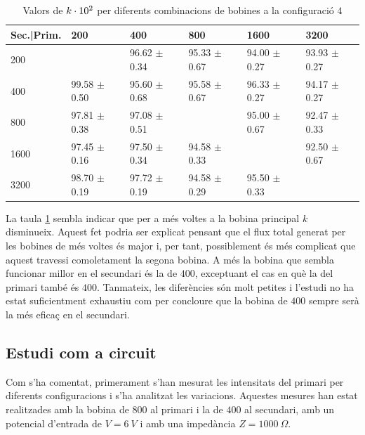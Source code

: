  \begin{table}[!htbp]\textwidth
     \centering
     \setlength\tabcolsep{2pt}
     \caption{Valors de $k \cdot \SI{d2}{}$ per diferents combinacions de bobines a la configuració $4$}
     \label{tab:k4}
\begin{tabular}{p{2cm}p{}p{}p{}p{}p{}}
			\toprule
		   {Sec.|Prim.}    &200&400&800&1600&3200 \\
			\midrule
			200 &  & 96.62 $\pm$ 0.34  & 95.33 $\pm$ 0.67 & 94.00 $\pm$ 0.27 &  93.93 $\pm$ 0.27 \\
			400 &  99.58 $\pm$ 0.50 & 95.60 $\pm$ 0.68 & 95.58 $\pm$ 0.67 & 96.33 $\pm$ 0.27 & 94.17 $\pm$ 0.27 \\
			800 &  97.81 $\pm$ 0.38 & 97.08 $\pm$ 0.51 & & 95.00 $\pm$ 0.67 & 92.47 $\pm$ 0.33\\
			1600 &  97.45 $\pm$ 0.16 & 97.50 $\pm$ 0.34 & 94.58 $\pm$ 0.33 & & 92.50 $\pm$ 0.67\\
			3200 & 98.70 $\pm$ 0.19 & 97.72 $\pm$ 0.19 & 94.58 $\pm$ 0.29 & 95.50 $\pm$ 0.33 & \\
			\bottomrule
\end{tabular}
\end{table}

La taula \cref{tab:k4} sembla indicar que per a més voltes a la bobina principal $ k$ disminueix. Aquest fet podria ser explicat pensant que el flux total generat per les bobines de més voltes és major i, per tant,  possiblement és més complicat que aquest travessi comoletament la segona bobina. A més la bobina que sembla funcionar millor en el secundari és la de $400$, exceptuant el cas en què la del primari també és $400$. Tanmateix, les diferències són molt petites i l'estudi no ha estat suficientment exhaustiu com per concloure que la bobina de $400$ sempre serà la més eficaç en el secundari.

\subsection{Estudi com a circuit}

Com s'ha comentat, primerament s'han mesurat les intensitats del primari per diferents configuracions i s'ha analitzat les variacions. Aquestes mesures han estat realitzades amb la bobina de $800$ al primari i la de $400$ al secundari, amb un potencial d'entrada de $V=\SI{6}{V}$ i amb una impedància $Z=\SI{1000}{\Omega}$. 

